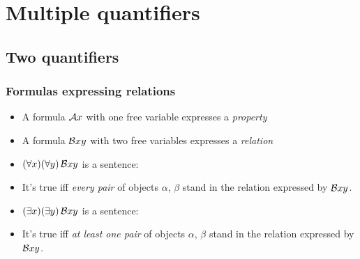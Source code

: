 ﻿%

\setcounter{section}{10}

\section{Multiple quantifiers}

\begin{frame}

\scriptsize{\tableofcontents}

\end{frame}

\subsection{Two quantifiers}

\begin{frame}
  \frametitle{Formulas expressing relations}

\begin{itemize}[<+->]
  \item A formula $\mathcal{A}x$ with one free variable expresses a \emph{property}
  \item A formula $\mathcal{B}xy$ with two free variables expresses a \emph{relation}
  \item $(\forall x)(\forall y)\, \mathcal{B}xy$ is a sentence: 
  \item It's true iff 
  \emph{every pair} of objects $\alpha$, $\beta$ stand in the relation expressed by $\mathcal{B}xy$.
  \item $(\exists x)(\exists y)\, \mathcal{B}xy$ is a sentence:
  \item It's true iff
  \emph{at least one pair} of objects $\alpha$, $\beta$ stand in the relation expressed by $\mathcal{B}xy$.
\end{itemize}
\end{frame}

